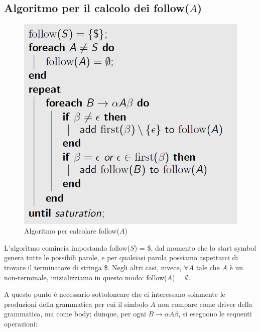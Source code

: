 \documentclass[class=book, crop=false, oneside, 12pt]{standalone}
\begin{document}
\subsection{Algoritmo per il calcolo dei follow(\(A\))}

\begin{figure}[H]
    \centering
    \includegraphics[width=.7\textwidth,keepaspectratio]{follow-algorithm.png}
    \caption{Algoritmo per calcolare follow(\(A\))}
    \label{follow-algorithm}
\end{figure}

L'algoritmo comincia impostando follow(\(S\)) = \$, dal momento che lo start symbol genera tutte le possibili parole, e per qualsiasi parola possiamo aspettarci di trovare il terminatore di stringa \$. Negli altri casi, invece, \(\forall A\) tale che \(A\) è un non-terminale, inizializziamo in questo modo: follow(\(A\)) = \(\emptyset\).

A questo punto è necessario sottoloneare che ci interessano solamente le produzioni della grammatica per cui il simbolo \(A\) non compare come driver della grammatica, ma come body; dunque, per ogni \(B \rightarrow \alpha A \beta\), si eseguono le sequenti operazioni: 
\end{document}
